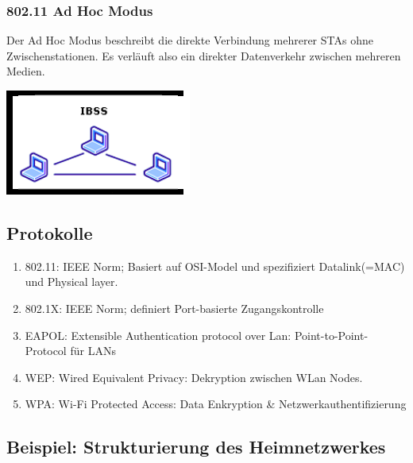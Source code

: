 \documentclass[11pt]{article}
\begin{document}
    \subsubsection{802.11 Ad Hoc Modus}
    \begin{minipage}{0.7\textwidth}     %
        Der Ad Hoc Modus beschreibt die direkte Verbindung mehrerer STAs ohne Zwischenstationen.
        Es verläuft also ein direkter Datenverkehr zwischen mehreren Medien.
    \end{minipage}
    \begin{minipage}{0.3\textwidth}     %
        \includegraphics[width=\linewidth]{802-11_AdHoc.png}
    \end{minipage}

    \subsection{Protokolle}
    \begin{enumerate}[$\diamond$]
        \item 802.11: IEEE Norm; Basiert auf OSI-Model und spezifiziert Datalink(=MAC) und Physical layer.
        \item 802.1X: IEEE Norm; definiert Port-basierte Zugangskontrolle
        \item EAPOL: Extensible Authentication protocol over Lan: Point-to-Point-Protocol für LANs
        \item WEP: Wired Equivalent Privacy: Dekryption zwischen WLan Nodes.
        \item WPA: Wi-Fi Protected Access: Data Enkryption \& Netzwerkauthentifizierung\\
    \end{enumerate}

    \subsection{Beispiel: Strukturierung des Heimnetzwerkes}
\end{document}
